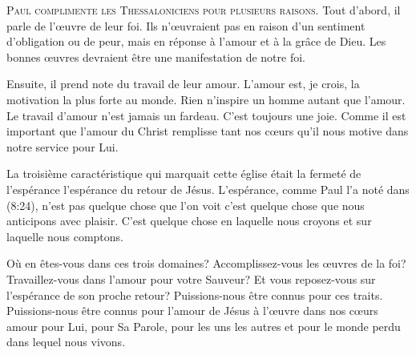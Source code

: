 


\lettrine{P}{aul complimente les Thessaloniciens pour plusieurs raisons.}
 Tout d'abord, il parle de l'œuvre de leur foi.
 Ils n'œuvraient pas en raison d'un sentiment d'obligation ou de peur,
 mais en réponse à l'amour et à la grâce de Dieu.
 Les bonnes œuvres devraient être une manifestation de notre foi.

Ensuite, il prend note du travail de leur amour. L'amour est, je crois,
 la motivation la plus forte au monde. Rien n'inspire un homme autant
 que l'amour. Le travail d'amour n'est jamais un fardeau.
 C'est toujours une joie. Comme il est important que l'amour du Christ
 remplisse tant nos cœurs qu'il nous motive dans notre service pour Lui.


La troisième caractéristique qui marquait cette église était la fermeté
 de l'espérance \ocadr l'espérance du retour de Jésus.
 L'espérance, comme Paul l'a noté dans (8:24),
 n'est pas quelque chose que l'on voit \ocadr c'est quelque chose que nous
 anticipons avec plaisir. C'est quelque chose en laquelle nous croyons
 et sur laquelle nous comptons.

Où en êtes-vous dans ces trois domaines? Accomplissez-vous
 les œuvres de la foi? Travaillez-vous dans l'amour pour votre Sauveur?
 Et vous reposez-vous sur l'espérance de son proche retour?
 Puissions-nous être connus pour ces traits. Puissions-nous être connus
 pour l'amour de Jésus à l'œuvre dans nos cœurs
 \ocadr amour pour Lui, pour Sa Parole, pour les uns les autres 
 et pour le monde perdu dans lequel nous vivons.

\dvrule






